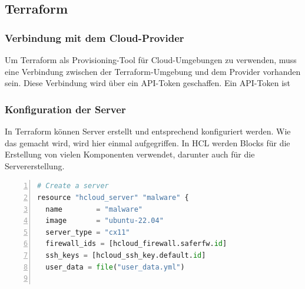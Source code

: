\begin{otherlanguage}{ngerman}
\subsection{Terraform}
\subsubsection{Verbindung mit dem Cloud-Provider}
Um Terraform als Provisioning-Tool für Cloud-Umgebungen zu verwenden, muss eine Verbindung zwischen der Terraform-Umgebung und dem Provider vorhanden sein. Diese Verbindung wird über ein API-Token geschaffen. Ein API-Token ist
\subsubsection{Konfiguration der Server}
In Terraform können Server erstellt und entsprechend konfiguriert werden. Wie das gemacht wird, wird hier einmal aufgegriffen. 
\newline
In HCL werden Blocks für die Erstellung von vielen Komponenten verwendet, darunter auch für die Servererstellung. 
\tt  
\begin{lstlisting}[caption = Konfiguration Malware-Server, language=python, numbers=left, numberstyle=\tiny]
# Create a server
resource "hcloud_server" "malware" {
  name        = "malware"
  image       = "ubuntu-22.04"
  server_type = "cx11"
  firewall_ids = [hcloud_firewall.saferfw.id]
  ssh_keys = [hcloud_ssh_key.default.id]
  user_data = file("user_data.yml")


\end{lstlisting}
\end{otherlanguage}
